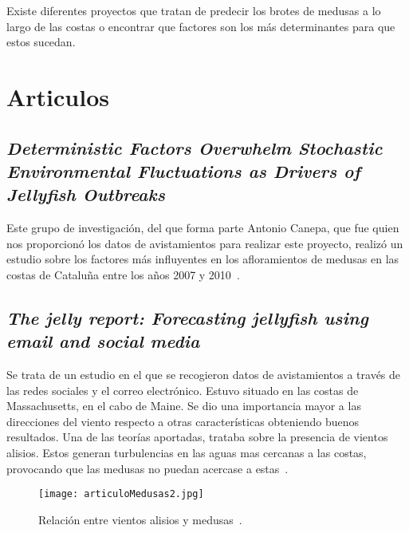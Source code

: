 

Existe diferentes proyectos que tratan de predecir los brotes de medusas a lo largo de las costas o encontrar que factores son los más determinantes para que estos sucedan.

\section{Articulos}

\subsection{\emph{Deterministic Factors Overwhelm Stochastic Environmental Fluctuations as Drivers of Jellyfish Outbreaks}}

Este grupo de investigación, del que forma parte Antonio Canepa, que fue quien nos proporcionó los datos de avistamientos para realizar este proyecto, realizó un estudio sobre los factores más influyentes en los afloramientos de medusas en las costas de Cataluña entre los años 2007 y 2010~\cite{art:ArticuloCanepa_1}.

\subsection{\emph{The jelly report: Forecasting jellyfish using email and social media}}

Se trata de un estudio en el que se recogieron datos de avistamientos a través de las redes sociales y el correo electrónico. Estuvo situado en las costas de Massachusetts, en el cabo de Maine. Se dio una importancia mayor a las direcciones del viento respecto a otras características obteniendo buenos resultados. Una de las teorías aportadas, trataba sobre la presencia de vientos alisios. Estos generan turbulencias en las aguas mas cercanas a las costas, provocando que las medusas no puedan acercase a estas~\cite{articulomedusas2}.
\begin{figure}%
	\centering
	\texttt{[image: articuloMedusas2.jpg]}
	\caption[Relación entre vientos alisios y medusas]{Relación entre vientos alisios y medusas~\cite{articulomedusas2}.}\label{}
\end{figure}

